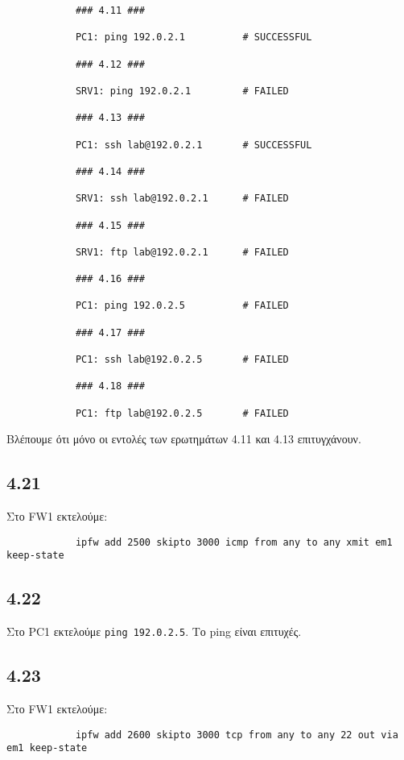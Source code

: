 \documentclass[a4paper, 12pt]{article}
\begin{document}
		\begin{verbatim}
			### 4.11 ###
			
			PC1: ping 192.0.2.1          # SUCCESSFUL
			
			### 4.12 ###
			
			SRV1: ping 192.0.2.1         # FAILED
			
			### 4.13 ###
			
			PC1: ssh lab@192.0.2.1       # SUCCESSFUL
			
			### 4.14 ###
			
			SRV1: ssh lab@192.0.2.1      # FAILED
			
			### 4.15 ### 
			
			SRV1: ftp lab@192.0.2.1      # FAILED
			
			### 4.16 ###
			
			PC1: ping 192.0.2.5          # FAILED
			
			### 4.17 ###
			
			PC1: ssh lab@192.0.2.5       # FAILED
			
			### 4.18 ###
			
			PC1: ftp lab@192.0.2.5       # FAILED
		\end{verbatim}
		
		Βλέπουμε ότι μόνο οι εντολές των ερωτημάτων 4.11 και 4.13 επιτυγχάνουν.

	\subsection*{4.21}
		Στο FW1 εκτελούμε:
		
		\begin{verbatim}
			ipfw add 2500 skipto 3000 icmp from any to any xmit em1 keep-state
		\end{verbatim}

	\subsection*{4.22}
		Στο PC1 εκτελούμε \verb|ping 192.0.2.5|. Το ping είναι επιτυχές.

	\subsection*{4.23}
		Στο FW1 εκτελούμε:
		
		\begin{verbatim}
			ipfw add 2600 skipto 3000 tcp from any to any 22 out via em1 keep-state
		\end{verbatim}
\end{document}
